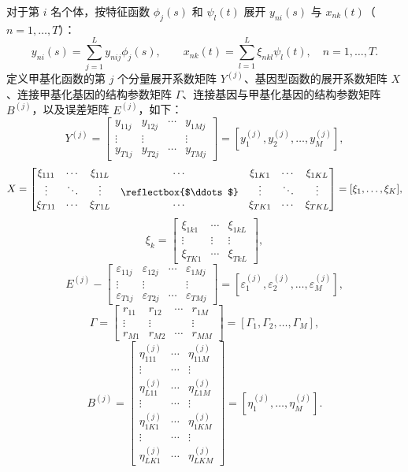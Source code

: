对于第 $i$ 名个体，按特征函数 $\phi_j(s)$ 和 $\psi_l(t)$ 展开 $y_{ni}(s)$ 与 $x_{nk}(t)$（$n=1,\ldots,T$）：
\[
y_{ni}(s)=\sum_{j=1}^Ly_{nij}\phi_j(s),\qquad
x_{nk}(t)=\sum_{l=1}^L\xi_{nkl}\psi_l(t),\quad n=1,\ldots,T.
\]
定义甲基化函数的第 $j$ 个分量展开系数矩阵 $Y^{(j)}$、基因型函数的展开系数矩阵 $X$、连接甲基化基因的结构参数矩阵 $\Gamma$、连接基因与甲基化基因的结构参数矩阵 $B^{(j)}$，以及误差矩阵 $E^{(j)}$，如下：
\[
Y^{(j)}=\begin{bmatrix}y_{11j}&y_{12j}&\cdots&y_{1Mj}\\\vdots&\vdots&&\vdots\\y_{T1j}&y_{T2j}&\cdots&y_{TMj}\end{bmatrix}
=[y_1^{(j)},y_2^{(j)},\ldots,y_M^{(j)}],
\]
\[
X=\begin{bmatrix}
\xi_{111}&\cdots&\xi_{11L}&\cdots&\xi_{1K1}&\cdots&\xi_{1KL}\\
\vdots&\ddots&\vdots&\reflectbox{$\ddots$}&\vdots&\ddots&\vdots\\
\xi_{T11}&\cdots&\xi_{T1L}&\cdots&\xi_{TK1}&\cdots&\xi_{TKL}
\end{bmatrix}=[\xi_1,\ldots,\xi_K],
\]
\[
\xi_k=\begin{bmatrix}\xi_{1k1}&\cdots&\xi_{1kL}\\\vdots&\vdots&\vdots\\\xi_{TK1}&\cdots&\xi_{TkL}\end{bmatrix},
\]
\[
E^{(j)}-\begin{bmatrix}\varepsilon_{11j}&\varepsilon_{12j}&\cdots&\varepsilon_{1Mj}\\\vdots&\vdots&&\vdots\\\varepsilon_{T1j}&\varepsilon_{T2j}&\cdots&\varepsilon_{TMj}\end{bmatrix}
=[\varepsilon_1^{(j)},\varepsilon_2^{(j)},\ldots,\varepsilon_M^{(j)}],
\]
\[
\Gamma=\begin{bmatrix}r_{11}&r_{12}&\cdots&r_{1M}\\\vdots&\vdots&&\vdots\\r_{M1}&r_{M2}&\cdots&r_{MM}\end{bmatrix}
=[\Gamma_1,\Gamma_2,\ldots,\Gamma_M],
\]
\[
B^{(j)}=\begin{bmatrix}
\eta_{111}^{(j)}&\cdots&\eta_{11M}^{(j)}\\
\vdots&\cdots&\vdots\\
\eta_{L11}^{(j)}&\cdots&\eta_{L1M}^{(j)}\\
\vdots&\cdots&\vdots\\
\eta_{1K1}^{(j)}&\cdots&\eta_{1KM}^{(j)}\\
\vdots&\cdots&\vdots\\
\eta_{LK1}^{(j)}&\cdots&\eta_{LKM}^{(j)}
\end{bmatrix}=[\eta_1^{(j)},\ldots,\eta_M^{(j)}].
\]
